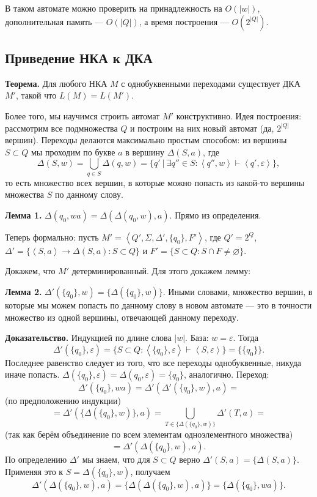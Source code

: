 В таком автомате можно проверить на принадлежность на $O(|w|)$, дополнительная память --- $O(|Q|)$, а время построения --- $O(2^{|Q|})$.

\subsection{Приведение НКА к ДКА}
\textbf{Теорема.} Для любого НКА $M$ с однобуквенными переходами существует ДКА $M'$, такой что $L(M) = L(M')$.

Более того, мы научимся строить автомат $M'$ конструктивно.
Идея построения: рассмотрим все подмножества $Q$ и построим на них новый автомат (да, $2^{|Q|}$ вершин).
Переходы делаются максимально простым способом: из вершины $S \subset Q$ мы проходим по букве $a$ в вершину $\Delta(S, a)$, где
\[
    \Delta(S, w) = \bigcup_{q \in S} \Delta(q, w) = \{q'~|~\exists q'' \in S: \left< q'', w \right> \vdash \left< q', \varepsilon \right> \},
\]
то есть множество всех вершин, в которые можно попасть из какой-то вершины множества $S$ по данному слову.

\textbf{Лемма 1.} $\Delta(q_0, wa) = \Delta(\Delta(q_0, w), a)$. Прямо из определения.

Теперь формально: пусть $M' = \left<Q', \Sigma, \Delta', \{q_0\}, F' \right>$, где $Q' = 2^Q$, $\Delta' = \{\left< S, a \right> \to \Delta(S, a): S \subset Q\}$ и $F' = \{S \subset Q: S \cap F \ne \varnothing\}$.

Докажем, что $M'$ детерминированный. Для этого докажем лемму:

\textbf{Лемма 2.} $\Delta'(\{q_0\}, w) = \{\Delta(\{q_0\}, w)\}$.
Иными словами, множество вершин, в которые мы можем попасть по данному слову в новом автомате --- это в точности множество из одной вершины, отвечающей данному переходу.

\textbf{Доказательство.} Индукцией по длине слова $|w|$. База: $w = \varepsilon$.
Тогда 
\[
    \Delta'(\{q_0\}, \varepsilon) = \{S \subset Q: \left<\{q_0\}, \varepsilon \right> \vdash \left< S, \varepsilon \right>\} = \{\{q_0\}\}.
\]
Последнее равенство следует из того, что все переходы однобуквенные, никуда иначе попасть.
$\Delta(\{q_0\}, \varepsilon) = \Delta(q_0, \varepsilon) = \{q_0\}$, аналогично.
Переход: 
\[
    \Delta'(\{q_0\}, wa) = \Delta'(\Delta'(\{q_0\}, w), a) =
\]
(по предположению индукции)
\[
    = \Delta'(\{\Delta(\{q_0\}, w)\}, a) = \bigcup_{T \in \{\Delta(\{q_0\}, w)\}} \Delta'(T, a) =
\]
(так как берём объединение по всем элементам одноэлементного множества)
\[
    = \Delta'(\Delta(\{q_0\}, w), a).
\]
По определению $\Delta'$ мы знаем, что для $S \subset Q$ верно $\Delta'(S, a) = \{\Delta(S, a)\}$.
Применяя это к $S = \Delta(\{q_0\}, w)$, получаем
\[
    \Delta'(\Delta(\{q_0\}, w), a) = \{\Delta(\Delta(\{q_0\}, w), a)\} = \{\Delta(\{q_0\}, wa)\}.
\]

